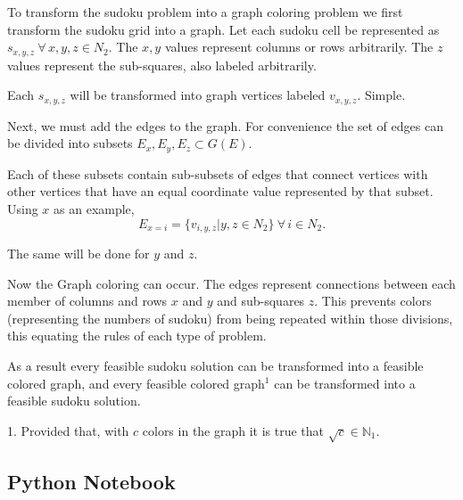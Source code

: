 \documentclass[12pt,letterpaper]{exam}
\begin{document}
\begin{questions}
\begin{solution}
		To transform the sudoku problem into a graph coloring problem we first 
		transform the sudoku grid into a graph.
		Let each sudoku cell be represented as \(s_{x,y,z}\ \forall\, x,y,z\in N_2\).
		The \(x,y\) values represent columns or rows arbitrarily.
		The \(z\) values represent the sub-squares, also labeled arbitrarily.
		
		Each \(s_{x,y,z}\) will be transformed into graph vertices labeled \(v_{x,y,z}\).
		Simple.
		
		Next, we must add the edges to the graph.
		For convenience the set of edges can be divided into subsets
		\(E_x,E_y,E_z \subset G(E)\).
		
		Each of these subsets contain sub-subsets of edges that connect vertices with other vertices
		that have an equal coordinate value represented by that subset. Using \(x\) as an example,		
		\[E_{x=i} = \{v_{i,y,z}|y,z\in N_2\}\ \forall\, i\in N_2.\]
		
		The same will be done for \(y\) and \(z\).
		
		Now the Graph coloring can occur. The edges represent connections between each member of
		columns and rows \(x\) and \(y\) and sub-squares \(z\). 
		This prevents colors (representing the numbers of sudoku) from being repeated within those divisions,
		this equating the rules of each type of problem.
		
		As a result every feasible sudoku solution can be transformed into a feasible colored graph,
		and every feasible colored graph\(^1\) can be transformed into a feasible sudoku solution.
		
		1. Provided that, with \(c\) colors in the graph it is true that \(\sqrt{c} \in \mathbb{N}_1\).
		
	\end{solution}
	
\end{questions}

\clearpage
\begin{appendices}
	
	\section{Python Notebook} \label{appendix:ipynb}
	\begin{minipage}{\textwidth}
	
	\end{minipage}
	

\end{appendices}
\end{document}
